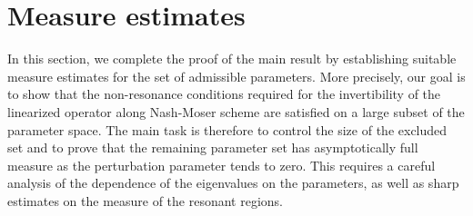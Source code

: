 \documentclass[a4paper,reqno,10pt]{article}
\begin{document}
\section{Measure estimates}\label{section-measures}


In this section, we complete the proof of the main result by establishing suitable measure estimates for the set of admissible parameters. More precisely, our goal is to show that the non-resonance conditions required for the invertibility of the linearized operator along Nash-Moser scheme are satisfied on a large subset of the parameter space.
The main task is therefore to control the size of the excluded set and to prove that the remaining parameter set has asymptotically full measure as the perturbation parameter tends to zero. This requires a careful analysis of the dependence of the eigenvalues on the parameters, as well as sharp estimates on the measure of the resonant regions.
\end{document}
